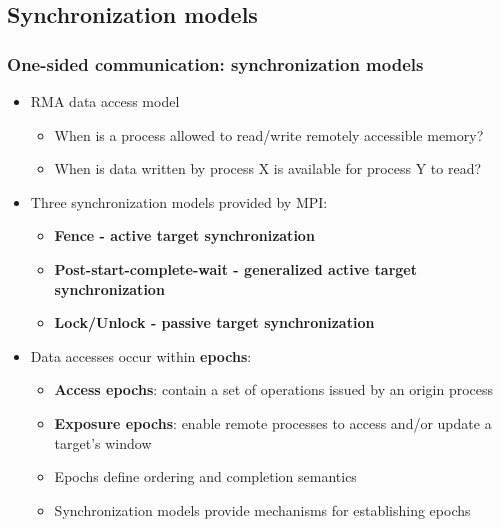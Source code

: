 \documentclass{beamer}
\begin{document}
\subsection{Synchronization models}
\begin{frame}[fragile]
  \frametitle{One-sided communication: synchronization models }
  \begin{itemize}
  \item RMA data access model
    \begin{itemize}
    \item When is a process allowed to read/write remotely accessible
      memory?
    \item When is data written by process X is available for process Y to read?
    \end{itemize}
  \item Three synchronization models provided by MPI:
    \begin{itemize}
    \item {\color{mycolordef}\textbf{Fence - active target synchronization}}
    \item {\color{mycolordef}\textbf{Post-start-complete-wait - generalized active target synchronization}}
    \item {\color{mycolordef}\textbf{Lock/Unlock - passive target synchronization}}
    \end{itemize}
  \item Data accesses occur within {\color{mycolordef}\textbf{epochs}}:
    \begin{itemize}
      \item {\color{mycolordef}\textbf{Access epochs}}: contain a set of operations issued by an origin process
      \item {\color{mycolordef}\textbf{Exposure epochs}}: enable remote processes to access and/or update a target's window
      \item Epochs define ordering and completion semantics
      \item Synchronization models provide mechanisms for establishing epochs
    \end{itemize}
  \end{itemize}
\end{frame}
\end{document}
